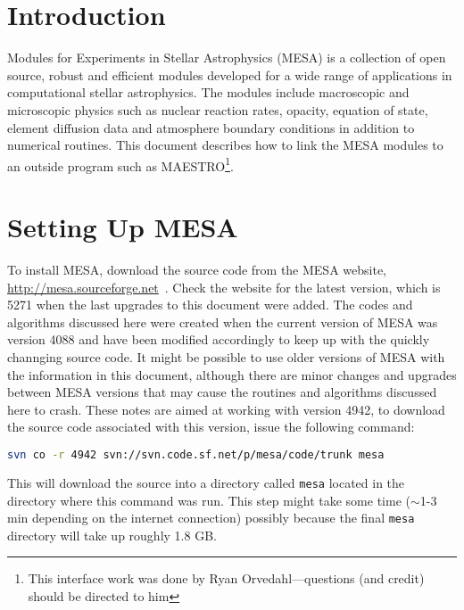 
\section{Introduction}

Modules for Experiments in Stellar Astrophysics ({\sf MESA}) is a collection 
of open source, robust and efficient modules developed for a wide range of 
applications in computational stellar astrophysics. The modules include 
macroscopic and microscopic physics such as nuclear reaction rates, opacity, 
equation of state, element diffusion data and atmosphere boundary conditions 
in addition to numerical routines. This document describes how to link the 
{\sf MESA} modules to an outside program such as {\sf MAESTRO}\footnote{This
  interface work was done by Ryan Orvedahl---questions (and credit)
  should be directed to him}.


\section{Setting Up {\sf MESA}}
\label{sec:setupmesa}

To install {\sf MESA}, download the source code from the {\sf MESA} website, 
\url{http://mesa.sourceforge.net}\, . Check the website for the latest version, 
which is 5271 when the last upgrades to this document were added. The codes 
and algorithms 
discussed here were created when the current version of {\sf MESA} was 
version 4088 and have been modified accordingly to keep up with the quickly 
channging source code. It might be possible to use older versions of 
{\sf MESA} with 
the information in this document, although there are minor changes and 
upgrades between {\sf MESA} versions that may cause the routines and algorithms 
discussed here to crash. These notes are aimed at working with 
version 4942, to download the source code associated with this version, 
issue the following command:
\begin{lstlisting}[language=bash,mathescape=false]
  svn co -r 4942 svn://svn.code.sf.net/p/mesa/code/trunk mesa
\end{lstlisting}
This will download the source into a directory called {\tt mesa} located 
in the directory where this command was run. This step might take some time 
($\sim$1-3 min depending on the internet connection) possibly because the 
final {\tt mesa} directory will take up roughly 1.8 GB.


